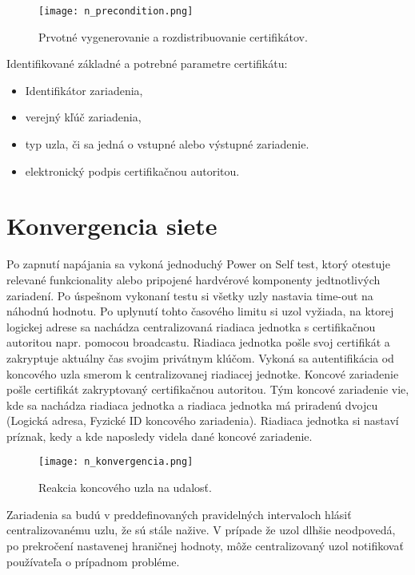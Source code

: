 \documentclass[12pt,a4wide,oneside,openright]{report}
\begin{document}

\begin{figure*}[h]
	\centering
	\texttt{[image: n\_precondition.png]}
	\caption{Prvotné vygenerovanie a rozdistribuovanie certifikátov.}
	\label{f:n_CA_distribution}
\end{figure*}


Identifikované základné a potrebné parametre  certifikátu:
\begin{itemize}
	\item Identifikátor zariadenia,
	\item verejný kľúč zariadenia,
	\item typ uzla, či sa jedná o vstupné alebo výstupné zariadenie.
	\item elektronický podpis certifikačnou autoritou.
\end{itemize}
\onehalfspacing

\section{Konvergencia siete}
Po zapnutí napájania sa vykoná jednoduchý Power on Self test, ktorý otestuje relevané funkcionality alebo pripojené hardvérové komponenty jedtnotlivých zariadení. Po úspešnom vykonaní testu si všetky uzly nastavia time-out na náhodnú hodnotu. Po uplynutí tohto časového limitu si uzol vyžiada, na ktorej logickej adrese sa nachádza centralizovaná riadiaca jednotka s certifikačnou autoritou napr. pomocou broadcastu. Riadiaca jednotka pošle svoj certifikát a zakryptuje aktuálny čas svojim privátnym klúčom. Vykoná sa autentifikácia od koncového uzla smerom k centralizovanej riadiacej jednotke. Koncové zariadenie pošle certifikát zakryptovaný certifikačnou autoritou. Tým koncové zariadenie vie, kde sa nachádza riadiaca jednotka a riadiaca jednotka má priradenú dvojcu (Logická adresa, Fyzické ID koncového zariadenia). Riadiaca jednotka si nastaví príznak, kedy a kde naposledy videla dané koncové zariadenie.

\begin{figure*}[h]
	\centering
	\texttt{[image: n\_konvergencia.png]}
	\caption{Reakcia koncového uzla na udalosť.}
	\label{f:n_konvergenica}
\end{figure*}

Zariadenia sa budú v preddefinovaných pravidelných intervaloch hlásiť centralizovanému uzlu, že sú stále nažive. V prípade že uzol dlhšie neodpovedá, po prekročení nastavenej hraničnej hodnoty, môže centralizovaný uzol notifikovať používateľa o prípadnom probléme.
\end{document}
